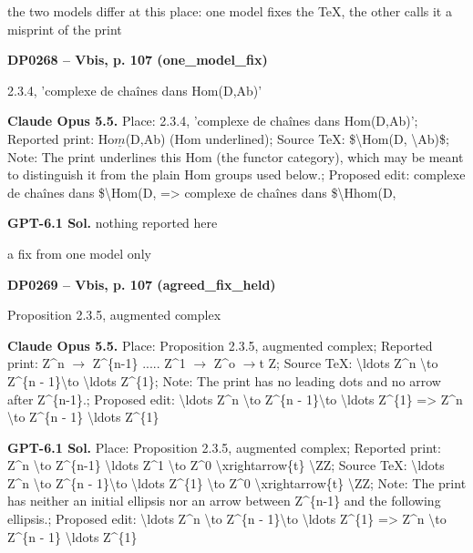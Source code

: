the two models differ at this place: one model fixes the TeX, the other calls it a misprint of the print\par
\par\noindent\hypertarget{DP0268}{}\textbf{DP0268 -- Vbis, p. 107 (one\_model\_fix)}\par
2.3.4, 'complexe de chaînes dans Hom(D,Ab)'\par
\textbf{Claude Opus 5.5.} Place: 2.3.4, 'complexe de chaînes dans Hom(D,Ab)'; Reported print: Ho\ensuremath{\underline{m}}(D,Ab) (Hom underlined); Source TeX: \$\textbackslash{}Hom(D, \textbackslash{}Ab)\$; Note: The print underlines this Hom (the functor category), which may be meant to distinguish it from the plain Hom groups used below.; Proposed edit: complexe de chaînes dans \$\textbackslash{}Hom(D, =\allowbreak > complexe de chaînes dans \$\textbackslash{}Hhom(D,\par
\textbf{GPT-6.1 Sol.} nothing reported here\par
a fix from one model only\par
\par\noindent\hypertarget{DP0269}{}\textbf{DP0269 -- Vbis, p. 107 (agreed\_fix\_held)}\par
Proposition 2.3.5, augmented complex\par
\textbf{Claude Opus 5.5.} Place: Proposition 2.3.5, augmented complex; Reported print: Z\textasciicircum{}n \ensuremath{\to} Z\textasciicircum{}\{n-1\} ..... Z\textasciicircum{}1 \ensuremath{\to} Z\textasciicircum{}o \ensuremath{\to}t Z; Source TeX: \textbackslash{}ldots Z\textasciicircum{}n \textbackslash{}to Z\textasciicircum{}\{n - 1\}\textbackslash{}to \textbackslash{}ldots Z\textasciicircum{}\{1\}; Note: The print has no leading dots and no arrow after Z\textasciicircum{}\{n-1\}.; Proposed edit: \textbackslash{}ldots Z\textasciicircum{}n \textbackslash{}to Z\textasciicircum{}\{n - 1\}\textbackslash{}to \textbackslash{}ldots Z\textasciicircum{}\{1\} =\allowbreak > Z\textasciicircum{}n \textbackslash{}to Z\textasciicircum{}\{n - 1\} \textbackslash{}ldots Z\textasciicircum{}\{1\}\par
\textbf{GPT-6.1 Sol.} Place: Proposition 2.3.5, augmented complex; Reported print: Z\textasciicircum{}n \textbackslash{}to Z\textasciicircum{}\{n-1\} \textbackslash{}ldots Z\textasciicircum{}1 \textbackslash{}to Z\textasciicircum{}0 \textbackslash{}xrightarrow\{t\} \textbackslash{}ZZ; Source TeX: \textbackslash{}ldots Z\textasciicircum{}n \textbackslash{}to Z\textasciicircum{}\{n - 1\}\textbackslash{}to \textbackslash{}ldots Z\textasciicircum{}\{1\} \textbackslash{}to Z\textasciicircum{}0 \textbackslash{}xrightarrow\{t\} \textbackslash{}ZZ; Note: The print has neither an initial ellipsis nor an arrow between Z\textasciicircum{}\{n-1\} and the following ellipsis.; Proposed edit: \textbackslash{}ldots Z\textasciicircum{}n \textbackslash{}to Z\textasciicircum{}\{n - 1\}\textbackslash{}to \textbackslash{}ldots Z\textasciicircum{}\{1\} =\allowbreak > Z\textasciicircum{}n \textbackslash{}to Z\textasciicircum{}\{n - 1\} \textbackslash{}ldots Z\textasciicircum{}\{1\}\par

